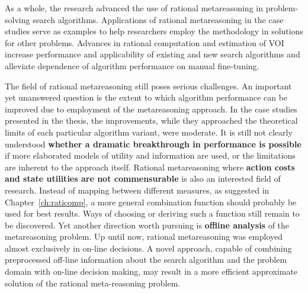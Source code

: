 As a whole, the research advanced the use of rational
metareasoning in problem-solving search algorithms. Applications of
rational metareasoning in the case studies serve as examples
to help researchers employ the methodology in solutions for other
problems. Advances in rational computation and estimation of VOI increase
performance and applicability of existing and new search algorithms
and alleviate dependence of algorithm performance on manual
fine-tuning.

The field of rational metareasoning still poses serious
challenges. An important yet unanswered question is the extent
to which algorithm performance can be improved due to employment of
the metareasoning approach. In the case studies presented in the thesis,
the improvements, while they approached the theoretical limits of each
particular algorithm variant, were moderate. It is still not clearly
understood \textbf{whether a dramatic breakthrough in performance is possible}
if more elaborated models of utility and information are used, or the 
limitations are inherent to the approach itself. Rational
metareasoning where \textbf{action costs and state utilities are not
  commensurable} is also an interested field of research. Instead of
mapping between different measures, as suggested in
Chapter~\ref{ch:raticomp}, a more general combination function should
probably be used for best results. Ways of choosing or deriving such a
function still remain to be discovered. Yet another direction worth
pursuing is \textbf{offline analysis} of the metareasoning
problem. Up until now, rational metareasoning was employed almost
exclusively in on-line decisions. A novel approach, capable of combining
preprocessed off-line information about the search algorithm and the
problem domain with on-line decision making, may result in a more
efficient approximate solution of the rational meta-reasoning problem.
